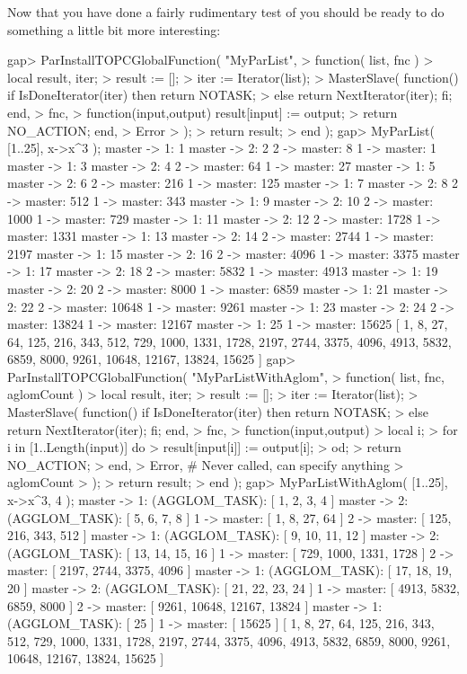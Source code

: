 Now that you have done a fairly rudimentary test of {\ParGAP} you  should
be ready to do something a little bit more interesting:

\beginexample
gap> ParInstallTOPCGlobalFunction( "MyParList",
> function( list, fnc )
>   local result, iter;
>   result := [];
>   iter := Iterator(list);
>   MasterSlave( function() if IsDoneIterator(iter) then return NOTASK;
>                           else return NextIterator(iter); fi; end,
>                fnc,
>                function(input,output) result[input] := output;
>                                       return NO_ACTION; end,
>                Error
>              );
>   return result;
> end );
gap> MyParList( [1..25], x->x^3 );
master -> 1:  1
master -> 2:  2
2 -> master: 8
1 -> master: 1
master -> 1:  3
master -> 2:  4
2 -> master: 64
1 -> master: 27
master -> 1:  5
master -> 2:  6
2 -> master: 216
1 -> master: 125
master -> 1:  7
master -> 2:  8
2 -> master: 512
1 -> master: 343
master -> 1:  9
master -> 2:  10
2 -> master: 1000
1 -> master: 729
master -> 1:  11
master -> 2:  12
2 -> master: 1728
1 -> master: 1331
master -> 1:  13
master -> 2:  14
2 -> master: 2744
1 -> master: 2197
master -> 1:  15
master -> 2:  16
2 -> master: 4096
1 -> master: 3375
master -> 1:  17
master -> 2:  18
2 -> master: 5832
1 -> master: 4913
master -> 1:  19
master -> 2:  20
2 -> master: 8000
1 -> master: 6859
master -> 1:  21
master -> 2:  22
2 -> master: 10648
1 -> master: 9261
master -> 1:  23
master -> 2:  24
2 -> master: 13824
1 -> master: 12167
master -> 1:  25
1 -> master: 15625
[ 1, 8, 27, 64, 125, 216, 343, 512, 729, 1000, 1331, 1728, 2197, 2744, 3375, 
  4096, 4913, 5832, 6859, 8000, 9261, 10648, 12167, 13824, 15625 ]
gap> ParInstallTOPCGlobalFunction( "MyParListWithAglom",
> function( list, fnc, aglomCount )
>   local result, iter;
>   result := [];
>   iter := Iterator(list);
>   MasterSlave( function() if IsDoneIterator(iter) then return NOTASK;
>                           else return NextIterator(iter); fi; end,
>                fnc,
>                function(input,output)
>                  local i;
>                  for i in [1..Length(input)] do
>                    result[input[i]] := output[i];
>                  od;
>                  return NO_ACTION;
>                end,
>                Error,  # Never called, can specify anything
>                aglomCount
>              );
>   return result;
> end );
gap> MyParListWithAglom( [1..25], x->x^3, 4 );
master -> 1: (AGGLOM_TASK): [ 1, 2, 3, 4 ]
master -> 2: (AGGLOM_TASK): [ 5, 6, 7, 8 ]
1 -> master: [ 1, 8, 27, 64 ]
2 -> master: [ 125, 216, 343, 512 ]
master -> 1: (AGGLOM_TASK): [ 9, 10, 11, 12 ]
master -> 2: (AGGLOM_TASK): [ 13, 14, 15, 16 ]
1 -> master: [ 729, 1000, 1331, 1728 ]
2 -> master: [ 2197, 2744, 3375, 4096 ]
master -> 1: (AGGLOM_TASK): [ 17, 18, 19, 20 ]
master -> 2: (AGGLOM_TASK): [ 21, 22, 23, 24 ]
1 -> master: [ 4913, 5832, 6859, 8000 ]
2 -> master: [ 9261, 10648, 12167, 13824 ]
master -> 1: (AGGLOM_TASK): [ 25 ]
1 -> master: [ 15625 ]
[ 1, 8, 27, 64, 125, 216, 343, 512, 729, 1000, 1331, 1728, 2197, 2744, 3375, 
  4096, 4913, 5832, 6859, 8000, 9261, 10648, 12167, 13824, 15625 ]
\endexample


